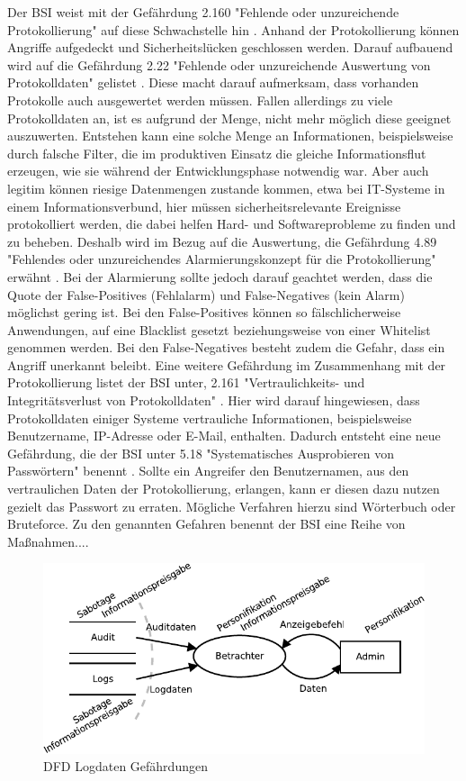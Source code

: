 \documentclass[11pt,a4paper]{report}
\begin{document}
Der BSI weist mit der Gefährdung 2.160 "Fehlende oder unzureichende Protokollierung" auf diese Schwachstelle hin \cite{bsi_g2160}. Anhand der Protokollierung können Angriffe aufgedeckt und Sicherheitslücken geschlossen werden. Darauf aufbauend wird auf die Gefährdung 2.22 "Fehlende oder unzureichende Auswertung von Protokolldaten" gelistet \cite{bsi_g2022}. Diese macht darauf aufmerksam, dass vorhanden Protokolle auch ausgewertet werden müssen. Fallen allerdings zu viele Protokolldaten an, ist es aufgrund der Menge, nicht mehr möglich diese geeignet auszuwerten. Entstehen kann eine solche Menge an Informationen, beispielsweise durch falsche Filter, die im produktiven Einsatz die gleiche Informationsflut erzeugen, wie sie während der Entwicklungsphase notwendig war. Aber auch legitim können riesige Datenmengen zustande kommen, etwa bei IT-Systeme in einem Informationsverbund, hier müssen sicherheitsrelevante Ereignisse protokolliert werden, die dabei helfen Hard- und Softwareprobleme zu finden und zu beheben. Deshalb wird im Bezug auf die Auswertung, die Gefährdung 4.89 "Fehlendes oder unzureichendes Alarmierungskonzept für die Protokollierung" erwähnt \cite{bsi_g4089}. Bei der Alarmierung sollte jedoch darauf geachtet werden, dass die Quote der False-Positives (Fehlalarm) und False-Negatives (kein Alarm) möglichst gering ist. Bei den False-Positives können so fälschlicherweise Anwendungen, auf eine Blacklist gesetzt beziehungsweise von einer Whitelist genommen werden. Bei den False-Negatives besteht zudem die Gefahr, dass ein Angriff unerkannt beleibt. Eine weitere Gefährdung im Zusammenhang mit der Protokollierung listet der BSI unter, 2.161 "Vertraulichkeits- und Integritätsverlust von Protokolldaten" \cite{bsi_g2161}. Hier wird darauf hingewiesen, dass  Protokolldaten einiger Systeme vertrauliche Informationen, beispielsweise Benutzername, IP-Adresse oder E-Mail, enthalten.	Dadurch entsteht eine neue Gefährdung, die der BSI unter 5.18 "Systematisches Ausprobieren von Passwörtern" benennt \cite{bsi_g5018}. Sollte ein Angreifer den Benutzernamen, aus den vertraulichen Daten der Protokollierung, erlangen, kann er diesen dazu nutzen gezielt das Passwort zu erraten. Mögliche Verfahren hierzu sind Wörterbuch oder Bruteforce. Zu den genannten Gefahren benennt der BSI eine Reihe von Maßnahmen....

\begin{figure}[htbp]
\centering
\includegraphics[scale=1.2]{images/dfd_logs_threats.pdf}
\caption{DFD Logdaten Gefährdungen}
\label{fig:dfd_logs_threat}
\end{figure}
\end{document}
